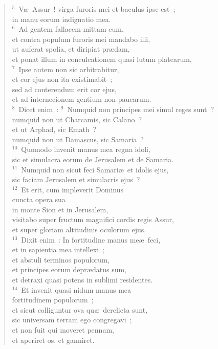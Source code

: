 \begin{verse}${}^{5}$~V\ae\ Assur~! virga furoris mei et baculus ipse est~;\\ in manu eorum indignatio mea.\\
${}^{6}$~Ad gentem fallacem mittam eum,\\ et contra populum furoris mei mandabo illi,\\ ut auferat spolia, et diripiat pr\ae dam,\\ et ponat illum in conculcationem quasi lutum platearum.\\
${}^{7}$~Ipse autem non sic arbitrabitur,\\ et cor ejus non ita existimabit~;\\ sed ad conterendum erit cor ejus,\\ et ad internecionem gentium non paucarum.\\
${}^{8}$~Dicet enim~:
${}^{9}$~Numquid non principes mei simul reges sunt~?\\ numquid non ut Charcamis, sic Calano~?\\ et ut Arphad, sic Emath~?\\ numquid non ut Damascus, sic Samaria~?\\
${}^{10}$~Quomodo invenit manus mea regna idoli,\\ sic et simulacra eorum de Jerusalem et de Samaria.\\
${}^{11}$~Numquid non sicut feci Samari\ae\ et idolis ejus,\\ sic faciam Jerusalem et simulacris ejus~?\\
${}^{12}$~Et erit, cum impleverit Dominus\\ cuncta opera sua\\ in monte Sion et in Jerusalem,\\ visitabo super fructum magnifici cordis regis Assur,\\ et super gloriam altitudinis oculorum ejus.\\
${}^{13}$~Dixit enim~: In fortitudine manus me\ae\ feci,\\ et in sapientia mea intellexi~;\\ et abstuli terminos populorum,\\ et principes eorum depr\ae datus sum,\\ et detraxi quasi potens in sublimi residentes.\\
${}^{14}$~Et invenit quasi nidum manus mea\\ fortitudinem populorum~;\\ et sicut colliguntur ova qu\ae\ derelicta sunt,\\ sic universam terram ego congregavi~;\\ et non fuit qui moveret pennam,\\ et aperiret os, et ganniret.\\

\end{verse}
